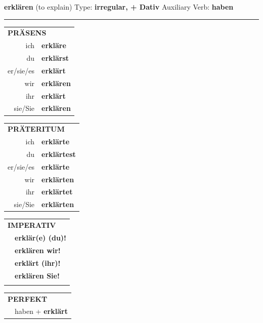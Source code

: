 \documentclass[10pt,a4paper]{revtex4-2}
\begin{document}
\begin{verbbox-dat}
    {\Large \bf erklären} (to explain) \hfill Type: \textbf{irregular, + Dativ} \hfill Auxiliary Verb: \textbf{haben} 
    
     \vspace{5pt}

    \hrule
    
    \vspace{5pt}

  \begin{tabular}{rl}
     \multicolumn{2}{l}{\textbf{PRÄSENS} }\\
    ich & \textbf{erkläre}\\
    du & \textbf{erklärst}\\
    er/sie/es & \textbf{erklärt}\\
    wir & \textbf{erklären}\\
    ihr & \textbf{erklärt}\\
    sie/Sie & \textbf{erklären}\\
  \end{tabular}
  \hfill
     \begin{tabular}{rl}
    \multicolumn{2}{l}{\textbf{PRÄTERITUM} }\\
    ich & \textbf{erklärte}\\
    du & \textbf{erklärtest}\\
    er/sie/es & \textbf{erklärte}\\
    wir & \textbf{erklärten}\\
    ihr & \textbf{erklärtet}\\
    sie/Sie & \textbf{erklärten}\\
  \end{tabular}
  \hfill
  \begin{tabular}{rl}
     \multicolumn{2}{l}{\textbf{IMPERATIV} }\\
   & \textbf{erklär(e) (du)!}\\
   & \textbf{erklären wir!}\\
   & \textbf{erklärt (ihr)!}\\
   & \textbf{erklären Sie!}\\
   & \vspace{10pt}
  \end{tabular}

    \vspace{10pt}

 \begin{tabular}{rl}
     \multicolumn{2}{l}{\textbf{PERFEKT}}\\
  &  haben + \textbf{erklärt}\\
  \end{tabular}
\hfill
   \begin{tabular}{rl}
   

\end{tabular}
\end{verbbox-dat}
\end{document}
